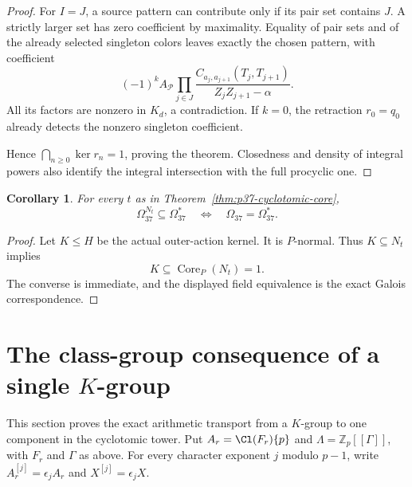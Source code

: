 \documentclass[11pt]{article}
\newtheorem{corollary}[theorem]{Corollary}
\theoremstyle{definition}\newtheorem{definition}[theorem]{Definition}
\newcommand{\Z}{\mathbb Z}\newcommand{\Q}{\mathbb Q}
\begin{document}
\begin{proof}
For \(I=J\), a source pattern can contribute only if its
pair set contains \(J\). A strictly larger set has zero
coefficient by maximality. Equality of pair sets and of
the already selected singleton colors leaves exactly
the chosen pattern, with coefficient
\[
 (-1)^k A_{\mathcal P}
   \prod_{j\in J}
   \frac{C_{a_j,a_{j+1}}(T_j,T_{j+1})}
             {Z_jZ_{j+1}-\alpha}.
\]
All its factors are nonzero in \(K_d\), a contradiction.
If \(k=0\), the retraction \(r_0=q_0\) already detects the
nonzero singleton coefficient.

Hence \(\bigcap_{n\ge0}\ker r_n=1\), proving the theorem.
Closedness and density of integral powers also identify
the integral intersection with the full procyclic one.
\end{proof}

\begin{corollary}\label{cor:one-lift-p37-faithfulness}
For every \(t\) as in Theorem~\ref{thm:p37-cyclotomic-core},
\[
 \Omega_{37}^{N_t}\subseteq\Omega_{37}^*
 \quad\Longleftrightarrow\quad
 \Omega_{37}=\Omega_{37}^*.
\]
\end{corollary}

\begin{proof}
Let \(K\le H\) be the actual outer-action kernel.
It is \(P\)-normal. Thus \(K\subseteq N_t\) implies
\[
 K\subseteq\operatorname{Core}_P(N_t)=1.
\]
The converse is immediate, and the displayed field
equivalence is the exact Galois correspondence.
\end{proof}


\section{The class-group consequence of a single $K$-group}
This section proves the exact arithmetic transport from a $K$-group to one
component in the cyclotomic tower. Put $A_r=\Cl(F_r)\{p\}$ and
$\Lambda=\Z_p[[\Gamma]]$, with $F_r$ and $\Gamma$ as above.
For every character exponent $j$ modulo $p-1$, write
$A_r^{[j]}=\epsilon_j A_r$ and $X^{[j]}=\epsilon_j X$.
\end{document}
